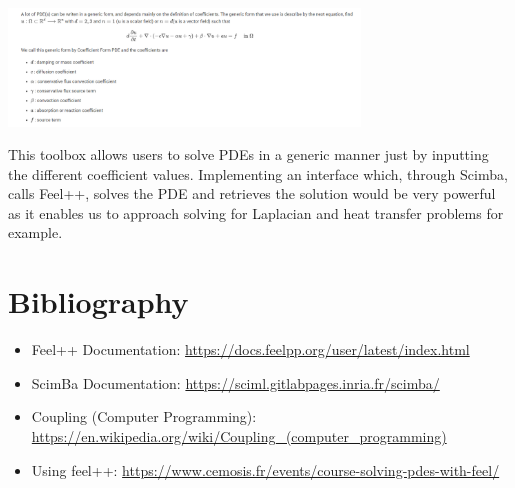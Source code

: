 \documentclass{article}
\begin{document}
\begin{frame}{}
    \begin{center}
        \includegraphics[width=0.7\textwidth]{images/cfpde.png}
    \end{center}
\end{frame}


\begin{frame}{}
This toolbox allows users to solve PDEs in a generic manner just by inputting the different coefficient values. Implementing an interface which, through Scimba, calls Feel++, solves the PDE and retrieves the solution would be very powerful as it enables us to approach solving for Laplacian and heat transfer problems for example.
\end{frame}


\section{Bibliography}

\begin{itemize}
    \item Feel++ Documentation: \url{https://docs.feelpp.org/user/latest/index.html}
    \item ScimBa Documentation: \url{https://sciml.gitlabpages.inria.fr/scimba/}
    \item Coupling (Computer Programming): \url{https://en.wikipedia.org/wiki/Coupling_(computer_programming)}
    \item Using feel++:
    \url{https://www.cemosis.fr/events/course-solving-pdes-with-feel/}
\end{itemize}
\end{document}
